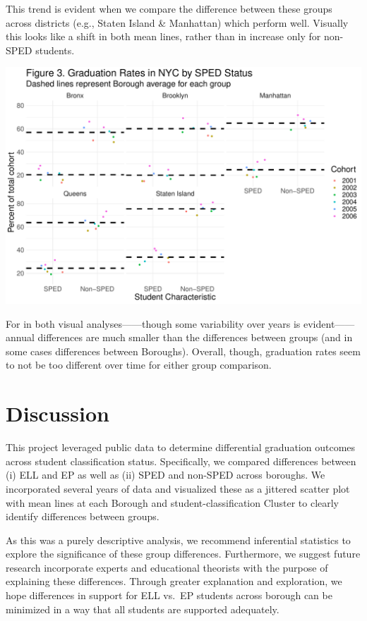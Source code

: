 \documentclass[
  english,
  man, fleqn, noextraspace]{apa6}
\begin{document}
This trend is evident when we compare the difference between these groups across districts (e.g., Staten Island \& Manhattan) which perform well. Visually this looks like a shift in both mean lines, rather than in increase only for non-SPED students.

\includegraphics{EDLD_651_Final_Project_Draft_files/figure-latex/graph_results_SPED-1.pdf}

For in both visual analyses------though some variability over years is evident------annual differences are much smaller than the differences between groups (and in some cases differences between Boroughs). Overall, though, graduation rates seem to not be too different over time for either group comparison.

\hypertarget{discussion}{%
\section{Discussion}\label{discussion}}

This project leveraged public data to determine differential graduation outcomes across student classification status. Specifically, we compared differences between (i) ELL and EP as well as (ii) SPED and non-SPED across boroughs. We incorporated several years of data and visualized these as a jittered scatter plot with mean lines at each Borough and student-classification Cluster to clearly identify differences between groups.

As this was a purely descriptive analysis, we recommend inferential statistics to explore the significance of these group differences. Furthermore, we suggest future research incorporate experts and educational theorists with the purpose of explaining these differences. Through greater explanation and exploration, we hope differences in support for ELL vs.~EP students across borough can be minimized in a way that all students are supported adequately.
\end{document}
